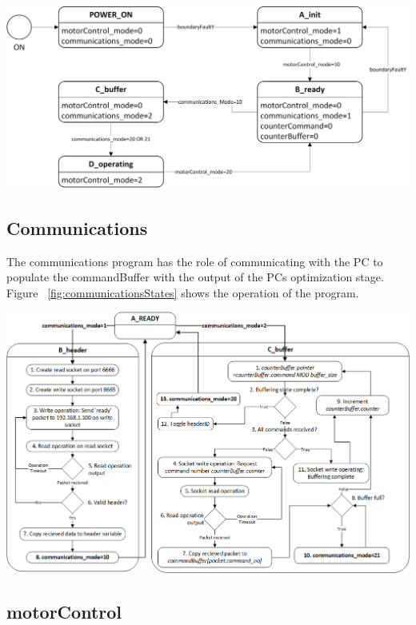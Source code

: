 		\begin{center}
				\includegraphics[width=\textwidth]{figures/cncMachine/governor}
				\label{fig:governor}
		\end{center}


\subsection{Communications}
	
	The communications program has the role of communicating with the PC to populate the commandBuffer with the output of the PCs optimization stage. Figure ~\ref{fig:communicationsStates} shows the operation of the program.
	\begin{center}
		\includegraphics[width=\textwidth]{figures/cncMachine/communications}
		\label{fig:communicationsStates}
	\end{center}
\subsection{motorControl}

